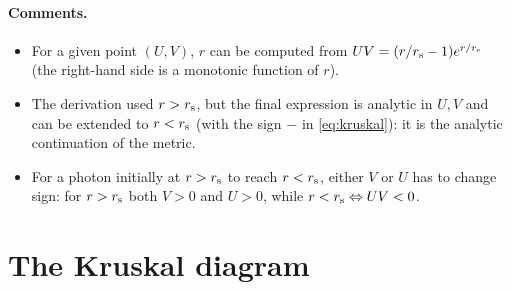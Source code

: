 \paragraph{Comments.}
\begin{itemize}
\item For a given point $(U,V)$, $r$ can be computed from $UV=(r/r_{\mathrm s}-1)e^{r/r_{\mathrm s}}$ (the right-hand side is a monotonic function of $r$).
\item The derivation used $r>r_{\mathrm s}$, but the final expression is analytic in $U,V$ and can be extended to $r<r_{\mathrm s}$ (with the sign $-$ in \eqref{eq:kruskal}): it is the analytic continuation of the metric.
\item For a photon initially at $r>r_{\mathrm s}$ to reach $r<r_{\mathrm s}$, either $V$ or $U$ has to change sign: for $r>r_{\mathrm s}$ both $V>0$ and $U>0$, while $r<r_{\mathrm s}\Leftrightarrow UV<0$.
\end{itemize}

\section{The Kruskal diagram}

